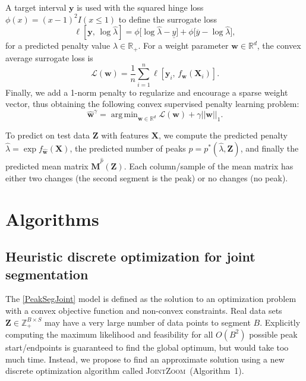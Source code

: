 \documentclass{article} %
\DeclareMathOperator*{\argmin}{arg\,min}
\newcommand{\RR}{\mathbb R}
\newcommand{\ZZ}{\mathbb Z}
\newcommand{\JointHeuristic}{\textsc{JointZoom}}
\begin{document}
A target interval $\mathbf y$ is used with the squared hinge loss
$\phi(x)=(x-1)^2 I(x\leq 1)$ to define the surrogate loss
\begin{equation}
  \label{eq:surrogate_loss}
  \ell\left[
    \mathbf y,\,
    \log \hat \lambda
    \right]
    =
    \phi\big[
      \log\hat\lambda - \underline y
    \big]
    +
    \phi\big[
    \overline y - \log\hat\lambda
    \big],
\end{equation}
for a predicted penalty value $\hat \lambda\in\RR_+$. For a weight parameter
$\mathbf w\in\RR^d$, the convex average surrogate loss is
\begin{equation}
  \label{eq:average_surrogate}
  \mathcal L(\mathbf w) =
  \frac 1 n
  \sum_{i=1}^n
  \ell\left[
    \mathbf y_i,\,
     f_{\mathbf w}( \mathbf X_i )
    \right].
\end{equation}
Finally, we add a 1-norm penalty to regularize and encourage a sparse
weight vector, thus obtaining the following convex supervised penalty
learning problem:
\begin{equation}
  \label{argmin_w}
  \mathbf{\hat w}^\gamma = 
  \argmin_{\mathbf w\in\RR^d}
  \mathcal L(\mathbf w) + \gamma ||\mathbf w||_1.
\end{equation}

To predict on test data $\mathbf Z$ with features $\mathbf X$, we
compute the predicted penalty $\hat \lambda = \exp f_{\mathbf{\hat
    w}}(\mathbf X)$, the predicted number of peaks $\hat p = p^*(\hat
\lambda, \mathbf Z)$, and finally the predicted mean matrix
$\mathbf{\hat M}^{\hat p}(\mathbf Z)$. Each column/sample of the mean
matrix has either two changes (the second segment is the peak) or no
changes (no peak).

\section{Algorithms}
\label{sec:algorithms}

\subsection{Heuristic discrete optimization for joint segmentation}

The \ref{PeakSegJoint} model is defined as the solution to an
optimization problem with a convex objective function and non-convex
constraints.  Real data sets $\mathbf Z\in\ZZ_+^{B\times S}$ may have
a very large number of data points to segment $B$. Explicitly
computing the maximum likelihood and feasibility for all $O(B^2)$
possible peak start/endpoints is guaranteed to find the global
optimum, but would take too much time.  Instead, we propose to find an
approximate solution using a new discrete optimization algorithm
called \JointHeuristic~(Algorithm~1).
\end{document}
